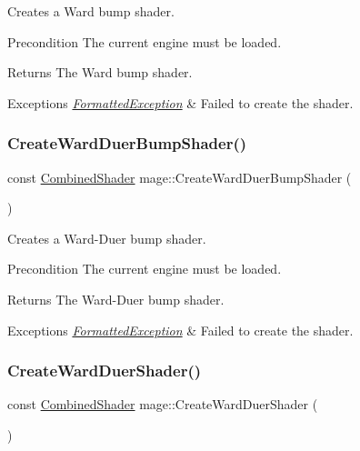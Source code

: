 Creates a Ward bump shader.

\begin{DoxyPrecond}{Precondition}
The current engine must be loaded. 
\end{DoxyPrecond}
\begin{DoxyReturn}{Returns}
The Ward bump shader. 
\end{DoxyReturn}

\begin{DoxyExceptions}{Exceptions}
{\em \hyperlink{structmage_1_1_formatted_exception}{Formatted\+Exception}} & Failed to create the shader. \\
\hline
\end{DoxyExceptions}
\hypertarget{namespacemage_a380539949a26cc91b47eacc5cde69866}{}\label{namespacemage_a380539949a26cc91b47eacc5cde69866} 
\subsubsection{\texorpdfstring{Create\+Ward\+Duer\+Bump\+Shader()}{CreateWardDuerBumpShader()}}
{\footnotesize\ttfamily const \hyperlink{structmage_1_1_combined_shader}{Combined\+Shader} mage\+::\+Create\+Ward\+Duer\+Bump\+Shader (\begin{DoxyParamCaption}{ }\end{DoxyParamCaption})}

Creates a Ward-\/\+Duer bump shader.

\begin{DoxyPrecond}{Precondition}
The current engine must be loaded. 
\end{DoxyPrecond}
\begin{DoxyReturn}{Returns}
The Ward-\/\+Duer bump shader. 
\end{DoxyReturn}

\begin{DoxyExceptions}{Exceptions}
{\em \hyperlink{structmage_1_1_formatted_exception}{Formatted\+Exception}} & Failed to create the shader. \\
\hline
\end{DoxyExceptions}
\hypertarget{namespacemage_aee250db29cd881c8d9c756a8625bab49}{}\label{namespacemage_aee250db29cd881c8d9c756a8625bab49} 
\subsubsection{\texorpdfstring{Create\+Ward\+Duer\+Shader()}{CreateWardDuerShader()}}
{\footnotesize\ttfamily const \hyperlink{structmage_1_1_combined_shader}{Combined\+Shader} mage\+::\+Create\+Ward\+Duer\+Shader (\begin{DoxyParamCaption}{ }\end{DoxyParamCaption})}

